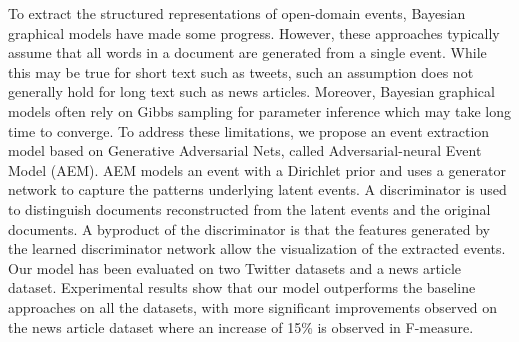 To extract the structured representations of open-domain events, Bayesian graphical models have made some progress.  However, these approaches typically assume that all words in a document are generated from a single event. While this may be true for short text such as tweets, such an assumption does not generally hold for long text such as news articles. Moreover, Bayesian graphical models often rely on Gibbs sampling for parameter inference which may take long time to converge. To address these limitations, we propose an event extraction model based on Generative Adversarial Nets, called Adversarial-neural Event Model (AEM). AEM models an event with a Dirichlet prior and uses a generator network to capture the patterns underlying latent events. A discriminator is used to distinguish documents reconstructed from the latent events and the original documents. A byproduct of the discriminator is that the features generated by the learned discriminator network allow the visualization of the extracted events. Our model has been evaluated on two Twitter datasets and a news article dataset. Experimental results show that our model outperforms the baseline approaches on all the datasets, with more significant improvements observed on the news article dataset where an increase of 15\% is observed in F-measure.